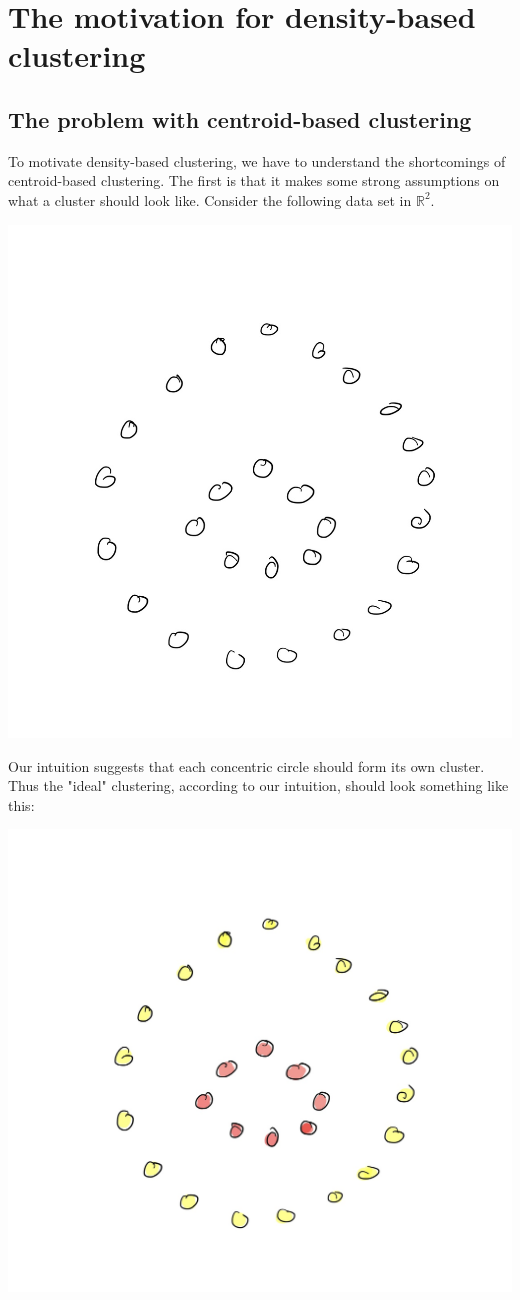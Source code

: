 \section{The motivation for density-based clustering}
  \subsection{The problem with centroid-based clustering}

To motivate density-based clustering, we have to understand the
shortcomings of centroid-based clustering. The first is that it makes
some strong assumptions on what a cluster should look like. Consider the following data set
in $\mathbb{R}^2$.

\begin{center}
\includegraphics[width=.7\linewidth]{chapter_2/images/raw.jpg}
\end{center}

Our intuition suggests that each concentric circle should form its own cluster.
Thus the "ideal" clustering, according to our intuition, should look something
like this:

\begin{center}
\includegraphics[width=.7\linewidth]{chapter_2/images/intuition.jpg}
\end{center}

